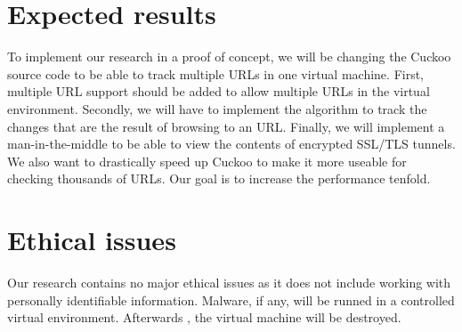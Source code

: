 \documentclass{scrartcl}
\begin{document}
\section{Expected results}

To implement our research in a proof of concept, we will be changing the Cuckoo source code to be able to track multiple URLs in one virtual machine. First, multiple URL support should be added to allow multiple URLs in the virtual environment. Secondly, we will have to implement the algorithm to track the changes that are the result of browsing to an URL. Finally, we will implement a man-in-the-middle to be able to view the contents of encrypted SSL/TLS tunnels.\\

We also want to drastically speed up Cuckoo to make it more useable for checking thousands of URLs. Our goal is to increase the performance tenfold.

\section{Ethical issues}

Our research contains no major ethical issues as it does not include working with personally identifiable information. Malware, if any, will be runned in a controlled virtual environment. Afterwards , the virtual machine will be destroyed.



\end{document}
